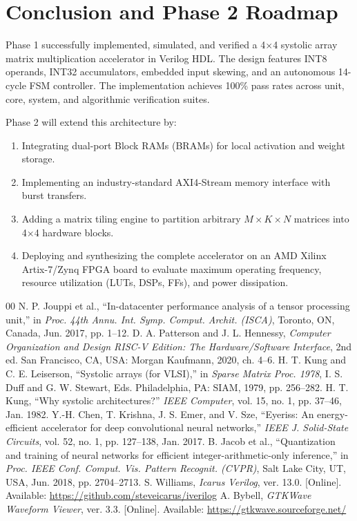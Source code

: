 \documentclass[conference]{IEEEtran}
\begin{document}
\section{Conclusion and Phase 2 Roadmap}
Phase 1 successfully implemented, simulated, and verified a 4$\times$4 systolic array matrix multiplication accelerator in Verilog HDL. The design features INT8 operands, INT32 accumulators, embedded input skewing, and an autonomous 14-cycle FSM controller. The implementation achieves 100\% pass rates across unit, core, system, and algorithmic verification suites.

Phase 2 will extend this architecture by:
\begin{enumerate}
    \item Integrating dual-port Block RAMs (BRAMs) for local activation and weight storage.
    \item Implementing an industry-standard AXI4-Stream memory interface with burst transfers.
    \item Adding a matrix tiling engine to partition arbitrary $M \times K \times N$ matrices into 4$\times$4 hardware blocks.
    \item Deploying and synthesizing the complete accelerator on an AMD Xilinx Artix-7/Zynq FPGA board to evaluate maximum operating frequency, resource utilization (LUTs, DSPs, FFs), and power dissipation.
\end{enumerate}

\begin{thebibliography}{00}
 N. P. Jouppi et al., ``In-datacenter performance analysis of a tensor processing unit,'' in \textit{Proc. 44th Annu. Int. Symp. Comput. Archit. (ISCA)}, Toronto, ON, Canada, Jun. 2017, pp. 1--12.
 D. A. Patterson and J. L. Hennessy, \textit{Computer Organization and Design RISC-V Edition: The Hardware/Software Interface}, 2nd ed. San Francisco, CA, USA: Morgan Kaufmann, 2020, ch. 4--6.
 H. T. Kung and C. E. Leiserson, ``Systolic arrays (for VLSI),'' in \textit{Sparse Matrix Proc. 1978}, I. S. Duff and G. W. Stewart, Eds. Philadelphia, PA: SIAM, 1979, pp. 256--282.
 H. T. Kung, ``Why systolic architectures?'' \textit{IEEE Computer}, vol. 15, no. 1, pp. 37--46, Jan. 1982.
 Y.-H. Chen, T. Krishna, J. S. Emer, and V. Sze, ``Eyeriss: An energy-efficient accelerator for deep convolutional neural networks,'' \textit{IEEE J. Solid-State Circuits}, vol. 52, no. 1, pp. 127--138, Jan. 2017.
 B. Jacob et al., ``Quantization and training of neural networks for efficient integer-arithmetic-only inference,'' in \textit{Proc. IEEE Conf. Comput. Vis. Pattern Recognit. (CVPR)}, Salt Lake City, UT, USA, Jun. 2018, pp. 2704--2713.
 S. Williams, \textit{Icarus Verilog}, ver. 13.0. [Online]. Available: \url{https://github.com/steveicarus/iverilog}
 A. Bybell, \textit{GTKWave Waveform Viewer}, ver. 3.3. [Online]. Available: \url{https://gtkwave.sourceforge.net/}
\end{thebibliography}
\end{document}
